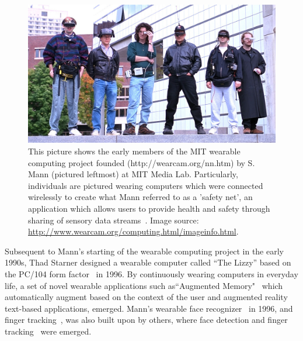 \begin{figure}[htb]
\center
 \includegraphics[width=5.5in]{ch1/figures/cyborgs.jpg}
 \caption{This picture shows the early members of the MIT wearable computing project founded (http://wearcam.org/nn.htm) by S. Mann (pictured leftmost) at MIT Media Lab. Particularly, individuals are pictured wearing computers which were connected wirelessly to create what Mann referred to as a 'safety net', an application which allows users to provide health and safety through sharing of sensory data streams~\cite{mann1997smart}. Image source: \url{http://www.wearcam.org/computing.html/imageinfo.html}. 
 }
 \label{fig:cyborgs}
\end{figure}

Subsequent to Mann's starting of the wearable computing project in the early 1990s, Thad Starner designed a wearable computer called ``The Lizzy'' based on the PC/104 form factor~\cite{starner1997augmented} in 1996. By continuously wearing computers in everyday life, a set of novel wearable applications such as``Augmented Memory"~\cite{starner1997augmented} which automatically augment based on the context of the user and augmented reality text-based applications, emerged.  Mann's wearable face recognizer~\cite{mann1996wearable} in 1996, and finger tracking~\cite{mann1997wearable}, was also built upon by others, where face detection and finger tracking~\cite{rhodes1997wearable} were emerged.





